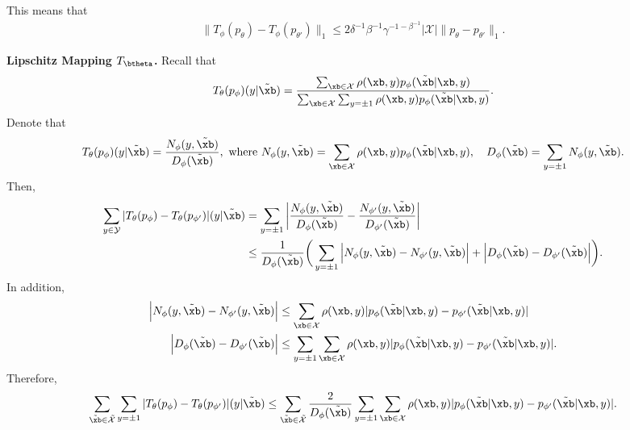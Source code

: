 This means that 
\begin{align*}
    \|T_\phi(p_\theta) - T_\phi(p_{\theta'}) \|_1 \le 2 \delta^{-1} \beta^{-1} \gamma^{-1-\beta^{-1}} |\mathcal{X}| \| p_\theta - p_{\theta'} \|_1.
\end{align*}

\textbf{Lipschitz Mapping $T_{\btheta}$.} Recall that 
\begin{align*}
    T_\theta(p_\phi)(y|\tilde{\xb}) = \frac{\sum_{\xb \in \mathcal{X}} \rho(\xb, y)  p_{\phi}(\tilde{\xb}|\xb,y)}{ \sum_{\xb \in \mathcal{X}} \sum_{y=\pm1}\rho(\xb, y)  p_{\phi}(\tilde{\xb}|\xb,y)}.
\end{align*}
Denote that
\begin{align*}
    T_\theta(p_\phi)(y|\tilde{\xb}) = \frac{N_\phi(y,\tilde{\xb})}{D_\phi (\tilde{\xb})},\text{ where } N_\phi(y,\tilde{\xb}) = \sum_{\xb \in \mathcal{X}} \rho(\xb, y) p_{\phi}(\tilde{\xb}|\xb,y),\quad D_\phi (\tilde{\xb}) = \sum_{y = \pm 1} N_\phi(y,\tilde{\xb}).
\end{align*}
Then,
\begin{align*}
    \sum_{y \in \mathcal{Y}}| T_\theta(p_\phi) - T_\theta(p_{\phi'}) |(y|\tilde{\xb}) & = \sum_{y =\pm 1} \bigg| \frac{N_\phi(y,\tilde{\xb})}{D_\phi (\tilde{\xb})} -  \frac{N_{\phi'}(y,\tilde{\xb})}{D_{\phi'} (\tilde{\xb})}  \bigg| \\
    & \le \frac{1}{D_\phi (\tilde{\xb})}\bigg( \sum_{y=\pm1}\Big|N_\phi(y,\tilde{\xb}) -  N_{\phi'}(y,\tilde{\xb})\Big| + \Big|D_\phi (\tilde{\xb}) -  D_{\phi'} (\tilde{\xb}) \Big| \bigg).
\end{align*}
In addition,
\begin{align*}
    \Big|N_\phi(y,\tilde{\xb}) -  N_{\phi'}(y,\tilde{\xb})\Big| &\le \sum_{\xb \in \mathcal{X}} \rho(\xb, y) | p_{\phi}(\tilde{\xb}|\xb, y) - p_{\phi'}(\tilde{\xb}|\xb, y)|  \\
    \Big|D_\phi (\tilde{\xb}) -  D_{\phi'} (\tilde{\xb}) \Big| &\le \sum_{y=\pm1}\sum_{\xb \in \mathcal{X}} \rho(\xb, y) | p_{\phi}(\tilde{\xb}|\xb,y) - p_{\phi'}(\tilde{\xb}|\xb,y)|.
\end{align*}
Therefore,
\begin{align*}
    \sum_{\tilde\xb\in\tilde{\mathcal{X}}}\sum_{y = \pm 1}| T_\theta(p_\phi) - T_\theta(p_{\phi'}) |(y|\tilde{\xb}) \le \sum_{\tilde\xb\in\tilde{\mathcal{X}}} \frac{2}{D_\phi (\tilde{\xb})} \sum_{y=\pm1}\sum_{\xb \in \mathcal{X}} \rho(\xb, y) | p_{\phi}(\tilde{\xb}|\xb,y) - p_{\phi'}(\tilde{\xb}|\xb,y)|.  
\end{align*}
